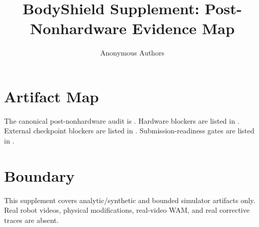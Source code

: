 \documentclass{article}
\title{BodyShield Supplement: Post-Nonhardware Evidence Map}
\author{Anonymous Authors}
\begin{document}
\maketitle
\section{Artifact Map}
The canonical post-nonhardware audit is . Hardware blockers are listed in . External checkpoint blockers are listed in . Submission-readiness gates are listed in .
\section{Boundary}
This supplement covers analytic/synthetic and bounded simulator artifacts only. Real robot videos, physical modifications, real-video WAM, and real corrective traces are absent.
\end{document}
